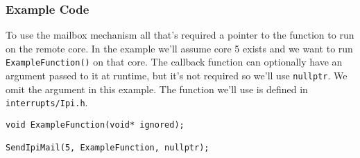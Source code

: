 \subsubsection{Example Code}
To use the mailbox mechanism all that's required a pointer to the function to run on the remote core. In the example we'll assume core 5 exists and we want to run \verb|ExampleFunction()| on that core. The callback function can optionally have an argument passed to it at runtime, but it's not required so we'll use \verb|nullptr|. We omit the argument in this example. The function we'll use is defined in \verb|interrupts/Ipi.h|.

\begin{verbatim}
void ExampleFunction(void* ignored);

SendIpiMail(5, ExampleFunction, nullptr);
\end{verbatim}
